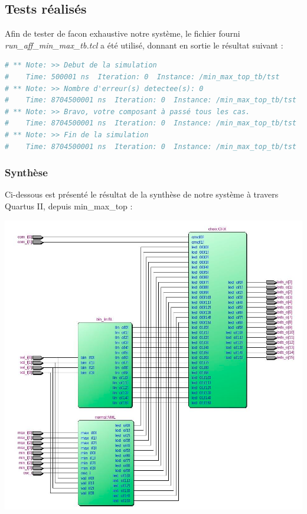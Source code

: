 \subsection{Tests réalisés}

Afin de tester de facon exhaustive notre système, le fichier fourni \textit{run\_aff\_min\_max\_tb.tcl} a été utilisé, donnant en sortie le résultat suivant : 
\begin{lstlisting}[language=bash]
# ** Note: >> Debut de la simulation
#    Time: 500001 ns  Iteration: 0  Instance: /min_max_top_tb/tst
# ** Note: >> Nombre d'erreur(s) detectee(s): 0
#    Time: 8704500001 ns  Iteration: 0  Instance: /min_max_top_tb/tst
# ** Note: >> Bravo, votre composant à passé tous les cas.
#    Time: 8704500001 ns  Iteration: 0  Instance: /min_max_top_tb/tst
# ** Note: >> Fin de la simulation
#    Time: 8704500001 ns  Iteration: 0  Instance: /min_max_top_tb/tst

\end{lstlisting}
\newpage
\subsubsection{Synthèse}
Ci-dessous est présenté le résultat de la synthèse de notre système à travers Quartus II, depuis min\_max\_top :
\begin{minipage}{\textwidth}
	\center
	\includegraphics[width=\textwidth]{figures/min_max_top.png}
    	\end{minipage}
    	

